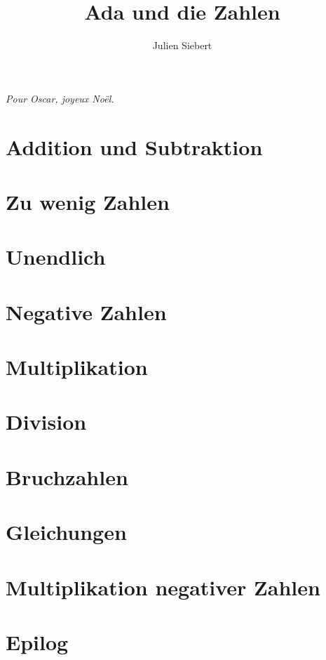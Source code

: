 \documentclass[a5paper,11pt,onecolumn]{book}
\title{Ada und die Zahlen}
\author{Julien Siebert}
\begin{document}
\maketitle
\textit{Pour Oscar, joyeux Noël.}
\chapter{}

\chapter[]{Addition und Subtraktion}

\chapter[]{Zu wenig Zahlen}

\chapter[]{Unendlich}

\chapter[]{Negative Zahlen}

\chapter[]{Multiplikation}

\chapter[]{Division}

\chapter[]{Bruchzahlen}

\chapter[]{Gleichungen}

\chapter[]{Multiplikation negativer Zahlen}

\chapter[]{Epilog}

\end{document}
